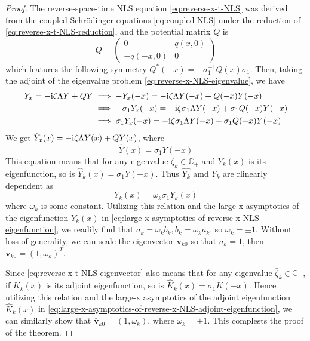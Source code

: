 \begin{proof}
    The reverse-space-time NLS equation \eqref{eq:reverse-x-t-NLS} was derived from the coupled Schrödinger equations \eqref{eq:coupled-NLS} under the reduction of \eqref{eq:reverse-x-t-NLS-reduction}, and the potential matrix $ Q $ is
    \begin{equation}
        Q = \begin{pmatrix}
            0 & q(x,0) \\
            -q(-x,0) & 0
        \end{pmatrix}
    \end{equation}
    which features the following symmetry $ Q^{*}(-x) = -\sigma_{1}^{-1}Q(x)\sigma_{1} $. Then, taking the adjoint of the eigenvalue problem \eqref{eq:reverse-x-NLS-eigenvalue}, we have
    \begin{equation}
        \begin{aligned}
        Y_{x} = -\mathrm{i} \zeta \Lambda Y + QY &\implies -Y_{x}(-x) = -\mathrm{i} \zeta \Lambda Y(-x) + Q(-x)Y(-x) \\
        &\implies -\sigma_{1} Y_{x}(-x)= -\mathrm{i} \zeta \sigma_{1}\Lambda Y(-x) + \sigma_{1}Q(-x)Y(-x) \\
        &\implies \sigma_{1}Y_{x}(-x) = -\mathrm{i} \zeta \sigma_{1}\Lambda Y(-x) +\sigma_{1}Q(-x)Y(-x) \\
        \end{aligned}
    \end{equation}
    We get $ \hat{Y}_{x}(x) = -\mathrm{i} \zeta  \Lambda Y(x) + QY(x) $, where
    \begin{equation}
        \hat{Y}(x) = \sigma_{1}Y(-x) \label{eq:reverse-x-t-NLS-eigenvector}
    \end{equation}
    This equation means that for any eigenvalue $ \zeta_{k} \in \mathbb{C}_{+} $ and $ Y_{k}(x) $ is its eigenfunction, so is $ \hat{Y}_{k}(x) = \sigma_{1} Y(-x)$. Thus $ \hat{Y_{k}} $ amd $ Y_{k} $ are rlinearly dependent as 
    \begin{equation}
        Y_{k}(x) = \omega_{k}\sigma_{1}Y_{k}(x)
    \end{equation}
    where $ \omega_{k} $ is some constant. Utilizing this relation and the large-x asymptotics of the eigenfunction $ Y_{k}(x) $ in \eqref{eq:large-x-asymptotics-of-reverse-x-NLS-eigenfunction}, we readily find that $ a_{k} = \omega_{k} b_{k}, b_{k} = \omega_{k} a_{k} $, so $ \omega_{k} = \pm 1 $. Without loss of generality, we can scale the eigenvector $\mathbf{v}_{k0} $ so that $ a_{k} = 1$, then $ \mathbf{v}_{k0} = (1, \omega_{k})^{T} $.

    Since \eqref{eq:reverse-x-t-NLS-eigenvector} also means that for any eigenvalue $ \bar{\zeta}_{k} \in \mathbb{C}_{-} $, if $ K_{k}(x) $ is its adjoint eigenfunction, so is $ \hat{K}_{k}(x) = \sigma_{1} K(-x) $. Hence utilizing this relation and the large-x asymptotics of the adjoint eigenfunction $ \hat{K}_{k}(x) $ in \eqref{eq:large-x-asymptotics-of-reverse-x-NLS-adjoint-eigenfunction}, we can similarly show that $ \bar{\mathbf{v}}_{k0} = (1, \bar{\omega}_{k}) $, where $ \bar{\omega}_{k} = \pm 1 $. This complests the proof of the theorem.
\end{proof}

